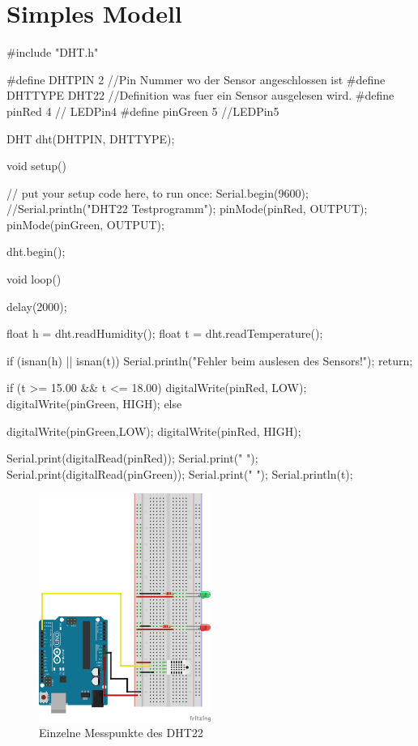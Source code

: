 \documentclass[12pt]{article}
\begin{document}
\section{Simples Modell}
\begin{code}
#include "DHT.h"

#define DHTPIN 2 //Pin Nummer wo der Sensor angeschlossen ist
#define DHTTYPE DHT22 //Definition was fuer ein Sensor ausgelesen wird.
#define pinRed 4 // LEDPin4
#define pinGreen 5 //LEDPin5

DHT dht(DHTPIN, DHTTYPE);

void setup() {
  // put your setup code here, to run once:
  Serial.begin(9600);
  //Serial.println("DHT22 Testprogramm");
  pinMode(pinRed, OUTPUT);
  pinMode(pinGreen, OUTPUT);

  dht.begin();

}

void loop() {
  delay(2000);

  float h = dht.readHumidity();
  float t = dht.readTemperature();

  if (isnan(h) || isnan(t)) {
    Serial.println("Fehler beim auslesen des Sensors!");
    return;
  }

  if (t >= 15.00 && t <= 18.00) {
    digitalWrite(pinRed, LOW);
    digitalWrite(pinGreen, HIGH);
  }
  else  {
    digitalWrite(pinGreen,LOW);
    digitalWrite(pinRed, HIGH);
    
  }
   
   Serial.print(digitalRead(pinRed));
   Serial.print(" ");
   Serial.print(digitalRead(pinGreen));
   Serial.print(" ");
   Serial.println(t);

}
\end{code}
\begin{figure}[H]
\begin{center}
\includegraphics[width=0.5\textwidth]{pics/dhtled.png}
\caption{Einzelne Messpunkte des DHT22}
\end{center}
\end{figure}
\end{document}
